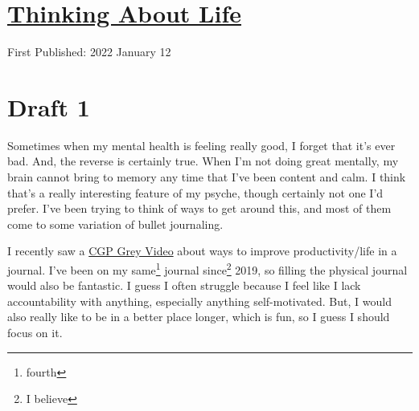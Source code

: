 \documentclass[12pt]{article}[titlepage]
\newcommand{\1}{\={a}}
\newcommand{\2}{\={e}}
\newcommand{\3}{\={\i}}
\newcommand{\4}{\=o}
\newcommand{\5}{\=u}
\newcommand{\6}{\={A}}
\renewcommand{\,}{\textsuperscript{,}}
\begin{document}
\doublespacing
\section{\href{thinking-about-life.html}{Thinking About Life}}
First Published: 2022 January 12

\section{Draft 1}
Sometimes when my mental health is feeling really good, I forget that it's ever bad.
And, the reverse is certainly true.
When I'm not doing great mentally, my brain cannot bring to memory any time that I've been content and calm.
I think that's a really interesting feature of my psyche, though certainly not one I'd prefer.
I've been trying to think of ways to get around this, and most of them come to some variation of bullet journaling.

I recently saw a \href{https://www.youtube.com/watch?v=fSwpe8r50_o}{CGP Grey Video} about ways to improve productivity/life in a journal.
I've been on my same\footnote{fourth} journal since\footnote{I believe} 2019, so filling the physical journal would also be fantastic.
I guess I often struggle because I feel like I lack accountability with anything, especially anything self-motivated.
But, I would also really like to be in a better place longer, which is fun, so I guess I should focus on it.
\end{document}

